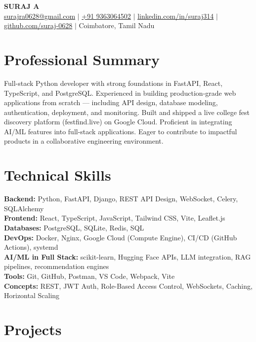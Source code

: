 \documentclass[10pt]{article}
\begin{document}
\begin{center}
  {\LARGE\textbf{SURAJ A}}\\[4pt]
  \small
  \href{mailto:surajra0628@gmail.com}{surajra0628@gmail.com} $|$
  \href{tel:+919363064502}{+91 9363064502} $|$
  \href{https://linkedin.com/in/suraj314}{linkedin.com/in/suraj314} $|$
  \href{https://github.com/suraj-0628}{github.com/suraj-0628} $|$
  Coimbatore, Tamil Nadu
\end{center}

\section{Professional Summary}
Full-stack Python developer with strong foundations in FastAPI, React, TypeScript, and PostgreSQL. Experienced in building production-grade web applications from scratch — including API design, database modeling, authentication, deployment, and monitoring. Built and shipped a live college fest discovery platform (festfind.live) on Google Cloud. Proficient in integrating AI/ML features into full-stack applications. Eager to contribute to impactful products in a collaborative engineering environment.

\section{Technical Skills}
\textbf{Backend:} Python, FastAPI, Django, REST API Design, WebSocket, Celery, SQLAlchemy \\
\textbf{Frontend:} React, TypeScript, JavaScript, Tailwind CSS, Vite, Leaflet.js \\
\textbf{Databases:} PostgreSQL, SQLite, Redis, SQL \\
\textbf{DevOps:} Docker, Nginx, Google Cloud (Compute Engine), CI/CD (GitHub Actions), systemd \\
\textbf{AI/ML in Full Stack:} scikit-learn, Hugging Face APIs, LLM integration, RAG pipelines, recommendation engines \\
\textbf{Tools:} Git, GitHub, Postman, VS Code, Webpack, Vite \\
\textbf{Concepts:} REST, JWT Auth, Role-Based Access Control, WebSockets, Caching, Horizontal Scaling

\section{Projects}
\end{document}
